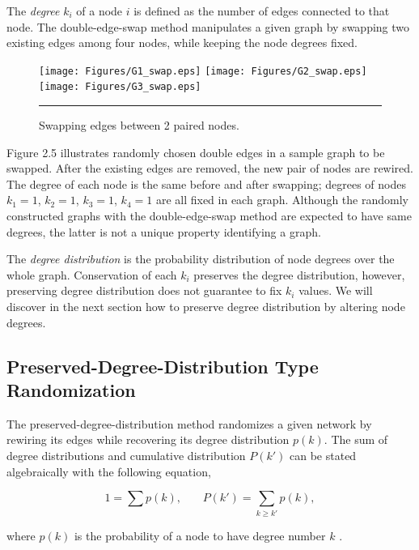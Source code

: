 The \textit{degree} $k_i$ of a node $i$ is defined as the number of edges connected to that node. The double-edge-swap method manipulates a given graph by swapping two existing edges among four nodes, while keeping the node degrees fixed. 


\begin{figure}[htbp]
  \centering
	\texttt{[image: Figures/G1\_swap.eps]}  
    \texttt{[image: Figures/G2\_swap.eps]}  
	\texttt{[image: Figures/G3\_swap.eps]} 
    \rule{35em}{0.5pt}
  \caption[Double-Edge-Swap Example]{Swapping edges between 2 paired nodes.}
  \label{fig:Double-Edge-Swap Example}
\end{figure}

Figure 2.5 illustrates randomly chosen double edges in a sample graph to be swapped. After the existing edges are removed, the new pair of nodes are rewired. The degree of each node is the same before and after swapping; degrees of nodes $k_1 = 1$, $k_2=1$, $k_3=1$, $k_4=1$ are all fixed in each graph. Although the randomly constructed graphs with the double-edge-swap method are expected to have same degrees, the latter is not a unique property identifying a graph.

The \textit{degree distribution} is the probability distribution of node degrees over the whole graph. Conservation of each $k_i$ preserves the degree distribution, however, preserving degree distribution does not guarantee to fix $k_i$ values. We will discover in the next section how to preserve degree distribution by altering node degrees.

\subsection{Preserved-Degree-Distribution Type Randomization}

The preserved-degree-distribution method randomizes a given network by rewiring its edges while recovering its degree distribution $p(k)$. The sum of degree distributions and cumulative distribution $P(k')$  can be stated algebraically with the following equation,

\begin{equation}
1= \sum{p(k)}, \,\,\,\,\,\,\,\,\,\,\,   P(k') = \sum_{k \geq k'} p(k),
\end{equation}

where $p(k)$ is the probability of a node to have degree number $k$ \citep{BAR99a}.


